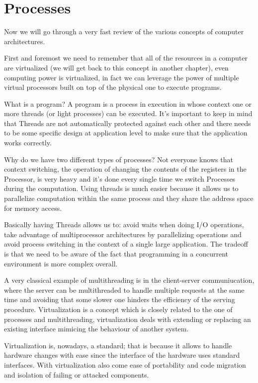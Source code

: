 \chapter{Processes}
Now we will go through a very fast review of the various concepts of computer architectures.

First and foremost we need to remember that all of the resources in a computer are virtualized (we will get back to this concept in another chapter), even computing power is virtualized, in fact we can leverage the power of multiple virtual processors built on top of the physical one to execute programs.

What is a program? A program is a process in execution in whose context one or more threads (or light processes) can be executed. It's important to keep in mind that Threads are not automatically protected against each other and there needs to be some specific design at application level to make sure that the application works correctly.

Why do we have two different types of processes? Not everyone knows that context switching, the operation of changing the contents of the registers in the Processor, is very heavy and it's done every single time we switch Processes during the computation. Using threads is much easier because it allows us to parallelize computation within the same process and they share the address space for memory access.

Basically having Threads allows us to: avoid waits when doing I/O operations, take advantage of multiprocessor architectures by parallelizing operations and avoid process switching in the context of a single large application. The tradeoff is that we need to be aware of the fact that programming in a concurrent environment is more complex overall.

A very classical example of multithreading is in the client-server communiucation, where the server can be multithreaded to handle multiple requests at the same time and avoiding that some slower one hinders the efficiency of the serving procedure. Virtualization is a concept which is closely related to the one of processes and multithreading, virtualization deals with extending or replacing an existing interface mimicing the behaviour of another system.

Virtualization is, nowadays, a standard; that is because it allows to handle hardware changes with ease since the interface of the hardware uses standard interfaces. With virtualization also come ease of portability and code migration and isolation of failing or attacked components.

